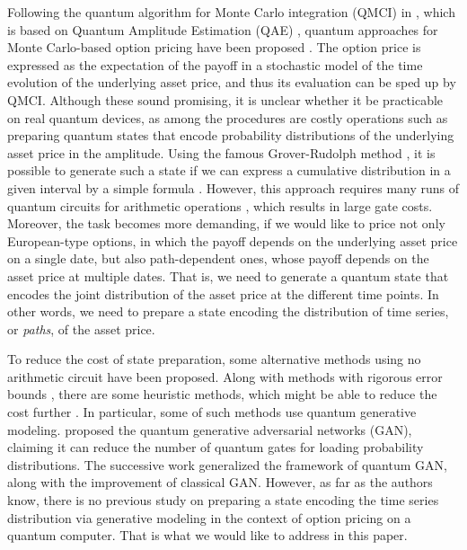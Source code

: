 {Following the quantum algorithm for Monte Carlo integration (QMCI) in \cite{montanaro2015quantum}, which is based on Quantum Amplitude Estimation (QAE) \cite{brassard2002quantum}, quantum approaches for Monte Carlo-based option pricing have been proposed \cite{rebentrost2018quantum,stamatopoulos2020option,kaneko2022quantum}. 
The option price is expressed as the expectation of the payoff in a stochastic model of the time evolution of the underlying asset price, and thus its evaluation can be sped up by QMCI.
Although these sound promising, it is unclear whether it be practicable on real quantum devices, as among the procedures are costly operations such as preparing quantum states that encode probability distributions of the underlying asset price in the amplitude.
Using the famous Grover-Rudolph method \cite{grover2002creating}, it is possible to generate such a state if we can express a cumulative distribution in a given interval by a simple formula \cite{kaneko2022quantum}.
However, this approach requires many runs of quantum circuits for arithmetic operations \cite{MunozCores2022}, which results in large gate costs.
Moreover, the task becomes more demanding, if we would like to price not only European-type options, in which the payoff depends on the underlying asset price on a single date, but also path-dependent ones, whose payoff depends on the asset price at multiple dates.
That is, we need to generate a quantum state that encodes the joint distribution of the asset price at the different time points.
In other words, we need to prepare a state encoding the distribution of time series, or {\it paths}, of the asset price.

To reduce the cost of state preparation, some alternative methods using no arithmetic circuit have been proposed.
Along with methods with rigorous error bounds \cite{Sanders2019,wang2021fast,Bausch2022fastblackboxquantum,Wang_2022,mcardle2022quantum,rattew2022preparing,Sanchez2023,Moosa_2023}, there are some heuristic methods, which might be able to reduce the cost further \cite{zoufal2019quantum,GarciaRipoll2021quantuminspired,Endo2020,Holmes2020,Sanchez2023}.
In particular, some of such methods use quantum generative modeling.
\cite{zoufal2019quantum} proposed the quantum generative adversarial networks (GAN), claiming it can reduce the number of quantum gates for loading probability distributions.
The successive work \cite{fuchs2023hybrid} generalized the framework of quantum GAN, along with the improvement of classical GAN.
However, as far as the authors know, there is no previous study on preparing a state encoding the time series distribution via generative modeling in the context of option pricing on a quantum computer.
That is what we would like to address in this paper.

}

